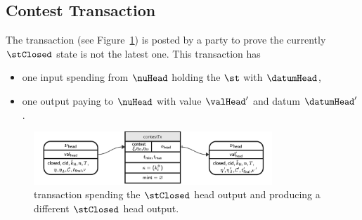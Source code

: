 \subsection{Contest Transaction}\label{sec:contest-tx}

The \mtxContest{} transaction (see Figure~\ref{fig:contestTx}) is posted by a
party to prove the currently $\stClosed$ state is not the latest one. This
transaction has
\begin{itemize}
  \item one input spending from $\nuHead$ holding the $\st$ with $\datumHead$,
  \item one output paying to $\nuHead$ with value $\valHead'$ and
  datum $\datumHead'$.
\end{itemize}

\begin{figure}
  \includegraphics[width=0.8\textwidth]{Hydra/Protocol/Figures/contestTx.pdf}
  \caption{\mtxContest{} transaction spending the $\stClosed$ head output and
	producing a different $\stClosed$ head output.}\label{fig:contestTx}
\end{figure}

